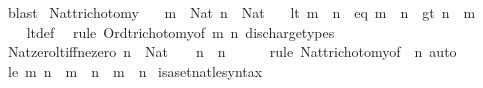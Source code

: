 \begin{isabellebody}
\ blast%
\endisatagproof
{\isafoldproof}%
%
\isadelimproof
\isanewline
%
\endisadelimproof
\isanewline
{}\isamarkupfalse%
\ Nat{\isacharunderscore}{\kern0pt}trichotomy{\isacharcolon}{\kern0pt}\isanewline
\ \ \ {\isachardoublequoteopen}m\ {\isacharcolon}{\kern0pt}\ Nat{\isachardoublequoteclose}\ {\isachardoublequoteopen}n\ {\isacharcolon}{\kern0pt}\ Nat{\isachardoublequoteclose}\isanewline
\ \ \ {\isacharparenleft}{\kern0pt}lt{\isacharparenright}{\kern0pt}\ {\isachardoublequoteopen}m\ {\isacharless}{\kern0pt}\ n{\isachardoublequoteclose}\ {\isacharbar}{\kern0pt}\ {\isacharparenleft}{\kern0pt}eq{\isacharparenright}{\kern0pt}\ {\isachardoublequoteopen}m\ {\isacharequal}{\kern0pt}\ n{\isachardoublequoteclose}\ {\isacharbar}{\kern0pt}\ {\isacharparenleft}{\kern0pt}gt{\isacharparenright}{\kern0pt}\ {\isachardoublequoteopen}n\ {\isacharless}{\kern0pt}\ m{\isachardoublequoteclose}\isanewline
\ \ \isanewline
%
\isadelimproof
\ \ %
\endisadelimproof
%
\isatagproof
{}\isamarkupfalse%
\ lt{\isacharunderscore}{\kern0pt}def\ \isamarkupfalse%
\ {\isacharparenleft}{\kern0pt}rule\ Ord{\isacharunderscore}{\kern0pt}trichotomy{\isacharbrackleft}{\kern0pt}of\ m\ n{\isacharbrackright}{\kern0pt}{\isacharparenright}{\kern0pt}\ discharge{\isacharunderscore}{\kern0pt}types%
\endisatagproof
{\isafoldproof}%
%
\isadelimproof
\isanewline
%
\endisadelimproof
\isanewline
{}\isamarkupfalse%
\ Nat{\isacharunderscore}{\kern0pt}zero{\isacharunderscore}{\kern0pt}lt{\isacharunderscore}{\kern0pt}iff{\isacharunderscore}{\kern0pt}ne{\isacharunderscore}{\kern0pt}zero{\isacharcolon}{\kern0pt}\ {\isachardoublequoteopen}n\ {\isacharcolon}{\kern0pt}\ Nat\ {\isasymLongrightarrow}\ {}\ {\isacharless}{\kern0pt}\ n\ {\isasymlongleftrightarrow}\ n\ {\isasymnoteq}\ {}{\isachardoublequoteclose}\isanewline
%
\isadelimproof
\ \ %
\endisadelimproof
%
\isatagproof
{}\isamarkupfalse%
\ {\isacharparenleft}{\kern0pt}rule\ Nat{\isacharunderscore}{\kern0pt}trichotomy{\isacharbrackleft}{\kern0pt}of\ {}\ n{\isacharbrackright}{\kern0pt}{\isacharparenright}{\kern0pt}\ auto%
\endisatagproof
{\isafoldproof}%
%
\isadelimproof
\isanewline
%
\endisadelimproof
\isanewline
\isanewline
{}\isamarkupfalse%
\ {\isachardoublequoteopen}le\ m\ n\ {\isasymequiv}\ m\ {\isacharless}{\kern0pt}\ n\ {\isasymor}\ m\ {\isacharequal}{\kern0pt}\ n{\isachardoublequoteclose}\isanewline
\isanewline
{}\isamarkupfalse%
\ isa{\isacharunderscore}{\kern0pt}set{\isacharunderscore}{\kern0pt}nat{\isacharunderscore}{\kern0pt}le{\isacharunderscore}{\kern0pt}syntax\ \ \isamarkupfalse%

\end{isabellebody}
